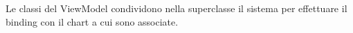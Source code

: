Le classi del ViewModel condividono nella superclasse il sistema per effettuare il binding con il chart a cui sono associate.

